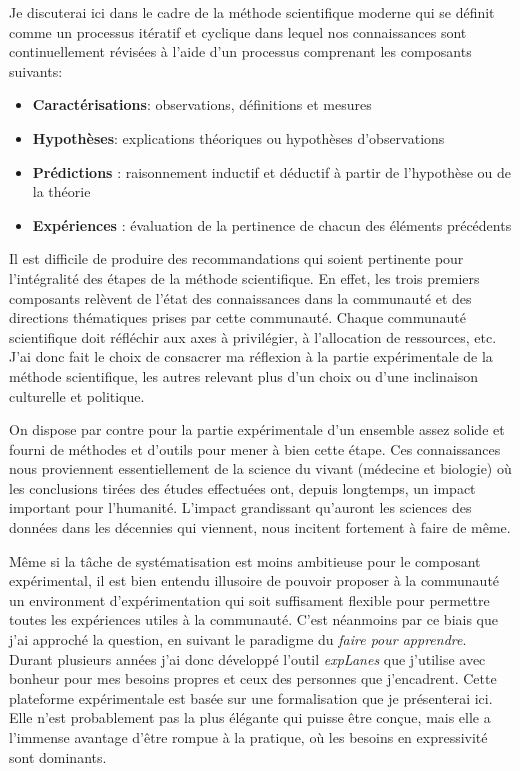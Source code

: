 Je discuterai ici dans le cadre de la méthode scientifique moderne qui se définit comme un processus itératif et cyclique dans lequel nos connaissances sont continuellement révisées à l'aide d'un processus comprenant les composants suivants:
\begin{itemize}
  \item \textbf{Caractérisations}: observations, définitions et mesures
  \item \textbf{Hypothèses}: explications théoriques ou hypothèses d'observations
  \item \textbf{Prédictions} : raisonnement inductif et déductif à partir de l'hypothèse ou de la théorie
  \item \textbf{Expériences} : évaluation de la pertinence de chacun des éléments précédents
\end{itemize}

Il est difficile de produire des recommandations qui soient pertinente pour l'intégralité des étapes de la méthode scientifique. En effet, les trois premiers composants relèvent de l'état des connaissances dans la communauté et des \og directions \fg thématiques prises par cette communauté. Chaque communauté scientifique doit réfléchir aux axes à privilégier, à l'allocation de ressources, etc. J'ai donc fait le choix de consacrer ma réflexion à la partie expérimentale de la méthode scientifique, les autres relevant plus d'un choix ou d'une inclinaison culturelle et politique.

On dispose par contre pour la partie expérimentale d'un ensemble assez solide et fourni de méthodes et d'outils pour mener à bien cette étape. Ces connaissances nous proviennent essentiellement de la science du vivant (médecine et biologie) où les conclusions tirées des études effectuées ont, depuis longtemps, un impact important pour l'humanité. L'impact grandissant qu'auront les sciences des données dans les décennies qui viennent, nous incitent fortement à faire de même.

Même si la tâche de systématisation est moins ambitieuse pour le composant expérimental, il est bien entendu illusoire de pouvoir proposer à la communauté un environment d'expérimentation qui soit suffisament flexible pour permettre toutes les expériences utiles à la communauté. C'est néanmoins par ce biais que j'ai approché la question, en suivant le paradigme du \textsl{faire pour apprendre}. Durant plusieurs années j'ai donc développé l'outil \textsl{expLanes}\cite{explanes} que j'utilise avec bonheur pour mes besoins propres et ceux des personnes que j'encadrent. Cette plateforme expérimentale est basée sur une formalisation que je présenterai ici. Elle n'est probablement pas la plus élégante qui puisse être conçue, mais elle a l'immense avantage d'être rompue à la pratique, où les besoins en expressivité sont dominants.

